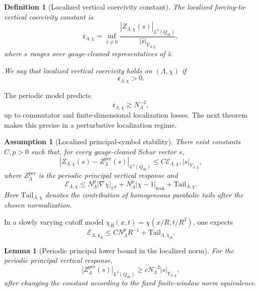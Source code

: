 \documentclass[11pt]{article}
\numberwithin{equation}{section}
\newtheorem{lemma}[theorem]{Lemma}
\newtheorem{definition}[theorem]{Definition}
\newtheorem{assumption}[theorem]{Assumption}
\begin{document}
\begin{definition}[Localized vertical coercivity constant]
The localized forcing-to-vertical coercivity constant is
\begin{equation}
\mathfrak c_{\Lambda,\chi} =
\inf_{\widehat s\neq0}
\frac{
|Z_{\Lambda,\chi}(s)|_{L^3(Q_{\mathrm{sh}})}
}{
|\widehat s|_{\widehat Y_{\Lambda,\chi}}
},
\label{eq:tag-10-211}
\end{equation}
where \(s\) ranges over gauge-cleaned representatives of \(\widehat s\).

We say that localized vertical coercivity holds on \((\Lambda,\chi)\) if
\[
\mathfrak c_{\Lambda,\chi}>0.
\]
\end{definition}

The periodic model predicts
\[
\mathfrak c_{\Lambda,\chi}
\gtrsim
N_\Lambda^{-2},
\]
up to commutator and finite-dimensional localization losses. The next theorem makes this precise in a perturbative localization regime.

\begin{assumption}[Localized principal-symbol stability]
There exist constants \(C,p>0\) such that, for every gauge-cleaned Schur vector \(s\),
\begin{equation}
|Z_{\Lambda,\chi}(s)-Z_{\Lambda}^{\mathrm{per}}(s)|_{L^3(Q_{\mathrm{sh}})}
\le
C\mathcal E_{\Lambda,\chi},
|s|_{Y_{\Lambda,\chi}},
\label{eq:tag-10-212}
\end{equation}
where \(Z_{\Lambda}^{\mathrm{per}}\) is the periodic principal vertical response and
\begin{equation}
\mathcal E_{\Lambda,\chi}
\le
N_\Lambda^p|\nabla\chi|_{C^p}
+
N_\Lambda^p|\chi-1|_{\mathrm{leak}}
+
\mathrm{Tail}_{\Lambda,\chi}.
\label{eq:tag-10-213}
\end{equation}
Here \(\mathrm{Tail}_{\Lambda,\chi}\) denotes the contribution of homogeneous parabolic tails after the chosen normalization.
\end{assumption}

In a slowly varying cutoff model \(\chi_R(x,t)=\chi(x/R,t/R^2)\), one expects
\[
\mathcal E_{\Lambda,\chi_R}
\le
C N_\Lambda^p R^{-1}
+
\mathrm{Tail}_{\Lambda,\chi_R}.
\]

\begin{lemma}[Periodic principal lower bound in the localized norm]
For the periodic principal vertical response,
\begin{equation}
|Z_{\Lambda}^{\mathrm{per}}(s)|_{L^3(Q_{\mathrm{sh}})}
\ge
cN_\Lambda^{-2}
|s|_{Y_{\Lambda,\chi}},
\label{eq:tag-10-214}
\end{equation}
after changing the constant according to the fixed finite-window norm equivalence.

\end{lemma}
\end{document}
